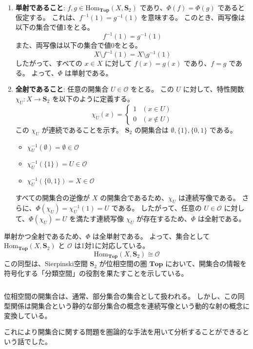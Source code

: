 \documentclass[uplatex,a4j,12pt,dvipdfmx]{jsarticle}
\begin{document}
\begin{enumerate}
	\item \textbf{単射であること}:
	      $f, g \in \mathrm{Hom}_{\mathbf{Top}}(X, \mathbf{S}_ {2})$ であり、$\Phi(f) = \Phi(g)$ であると仮定する。
	      これは、$f^{-1}(1) = g^{-1}(1)$ を意味する。
	      このとき、両写像は以下の集合で値1をとる。
	      $$ f^{-1}(1) = g^{-1}(1) $$
	      また、両写像は以下の集合で値0をとる。
	      $$ X \setminus f^{-1}(1) = X \setminus g^{-1}(1) $$
	      したがって、すべての $x \in X$ に対して $f(x) = g(x)$ であり、$f = g$ である。
	      よって、$\Phi$ は単射である。

	\item \textbf{全射であること}:
	      任意の開集合 $U \in \mathcal{O}$ をとる。
	      この $U$ に対して、特性関数 $\chi_U: X \to \mathbf{S}_ {2}$ を以下のように定義する。
	      $$ \chi_U(x) =
		      \begin{cases}
			      1 & (x \in U)    \\
			      0 & (x \notin U)
		      \end{cases}
	      $$
	      この $\chi_U$ が連続であることを示す。
	      $\mathbf{S}_ {2}$ の開集合は $\emptyset, \{1\}, \{0, 1\}$ である。
	      \begin{itemize}
		      \item $\chi_U^{-1}(\emptyset) = \emptyset \in \mathcal{O}$
		      \item $\chi_U^{-1}(\{1\}) = U \in \mathcal{O}$
		      \item $\chi_U^{-1}(\{0, 1\}) = X \in \mathcal{O}$
	      \end{itemize}
	      すべての開集合の逆像が $X$ の開集合であるため、$\chi_U$ は連続写像である。
	      さらに、$\Phi(\chi_U) = \chi_U^{-1}(1) = U$ である。
	      したがって、任意の $U \in \mathcal{O}$ に対して、$\Phi(\chi_U) = U$ を満たす連続写像 $\chi_U$ が存在するため、$\Phi$ は全射である。
\end{enumerate}

単射かつ全射であるため、$\Phi$ は全単射である。
よって、集合として $\mathrm{Hom}_{\mathbf{Top}}(X, \mathbf{S}_ {2})$ と $\mathcal{O}$ は1対1に対応している。
$$
	\mathrm{Hom}_{\mathbf{Top}}(X, \mathbf{S}_ {2}) \cong \mathcal{O}
$$
この同型は、Sierpinski空間 $\mathbf{S}_ {2}$ が位相空間の圏 $\mathbf{Top}$ において、開集合の情報を符号化する「分類空間」の役割を果たすことを示している。

${}$

位相空間の開集合は、通常、部分集合の集合として扱われる。
しかし、この同型関係は開集合という静的な部分集合の概念を連続写像という動的な射の概念に変換している。

これにより開集合に関する問題を圏論的な手法を用いて分析することができるという話でした。
\end{document}
